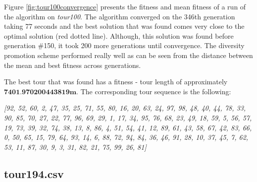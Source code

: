 \documentclass[a4paper,10pt]{article}
\newcommand{\ReplaceMe}[1]{{\color{blue}#1}}
\begin{document}
%
%

Figure \ref{fig:tour100convergence} presents the fitness and mean fitness of a run of the algorithm on \textit{tour100}. The algorithm converged on the 346th generation taking 77 seconds and the best solution that was found comes very close to the optimal solution (red dotted line). Although, this solution was found before generation \#150, it took 200 more generations until convergence. The diversity promotion scheme performed really well as can be seen from the distance between the mean and best fitness across generations.

The best tour that was found has a fitness - tour length of approximately $\textbf{7401.970200443819m}$. The corresponding tour sequence is the following:\\

\begin{minipage}{\textwidth}
\centering
\textit{[92, 52, 60, 2, 47, 35, 25, 71, 55, 80, 16, 20, 63, 24, 97, 98, 48, 40, 44, 78, 33, 90, 85, 70, 27, 22, 77, 96, 69, 29, 1, 17, 34, 95, 76, 68, 23, 49, 18, 59, 5, 56, 57, 19, 73, 39, 32, 74, 38, 13, 8, 86, 4, 51, 54, 41, 12, 89, 61, 43, 58, 67, 42, 83, 66, 0, 50, 65, 15, 79, 64, 93, 14, 6, 88, 72, 94, 84, 36, 46, 91, 28, 10, 37, 45, 7, 62, 53, 11, 87, 30, 9, 3, 31, 82, 21, 75, 99, 26, 81]}
\end{minipage}

\subsection{tour194.csv} \label{ss:tour194}

%
%
\end{document}
